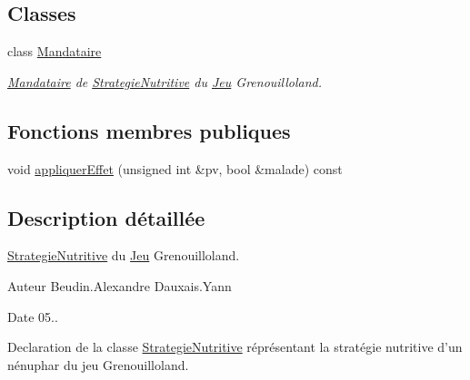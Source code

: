 \subsection*{Classes}
\begin{DoxyCompactItemize}
\item 
class \hyperlink{classgrenouilloland_1_1StrategieNutritive_1_1Mandataire}{Mandataire}
\begin{DoxyCompactList}\small\item\em \hyperlink{classgrenouilloland_1_1StrategieNutritive_1_1Mandataire}{Mandataire} de \hyperlink{classgrenouilloland_1_1StrategieNutritive}{Strategie\-Nutritive} du \hyperlink{classgrenouilloland_1_1Jeu}{Jeu} Grenouilloland. \end{DoxyCompactList}\end{DoxyCompactItemize}
\subsection*{Fonctions membres publiques}
\begin{DoxyCompactItemize}
\item 
void \hyperlink{classgrenouilloland_1_1StrategieNutritive_aa7338486cae06a62f5f155d72f40ab87}{appliquer\-Effet} (unsigned int \&pv, bool \&malade) const 
\end{DoxyCompactItemize}


\subsection{Description détaillée}
\hyperlink{classgrenouilloland_1_1StrategieNutritive}{Strategie\-Nutritive} du \hyperlink{classgrenouilloland_1_1Jeu}{Jeu} Grenouilloland. 

\begin{DoxyAuthor}{Auteur}
Beudin.\-Alexandre Dauxais.\-Yann 
\end{DoxyAuthor}
\begin{DoxyDate}{Date}
05..
\end{DoxyDate}
Declaration de la classe \hyperlink{classgrenouilloland_1_1StrategieNutritive}{Strategie\-Nutritive} réprésentant la stratégie nutritive d'un nénuphar du jeu Grenouilloland. 

